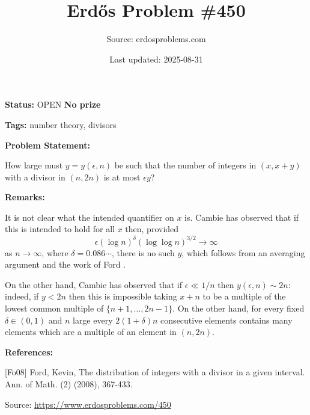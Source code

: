 \documentclass{article}
\title{Erd\H{o}s Problem \#450}
\date{Last updated: 2025-08-31}
\author{Source: erdosproblems.com}
\begin{document}
\maketitle

\noindent\textbf{Status:} OPEN \quad \textbf{No prize}

\noindent\textbf{Tags:} number theory, divisors

\medskip
\noindent\textbf{Problem Statement:}

How large must $y=y(\epsilon,n)$ be such that the number of integers in $(x,x+y)$ with a divisor in $(n,2n)$ is at most $\epsilon y$?

\bigskip
\noindent\textbf{Remarks:}

It is not clear what the intended quantifier on $x$ is. Cambie has observed that if this is intended to hold for all $x$ then, provided\[\epsilon(\log n)^\delta (\log\log n)^{3/2}\to \infty\]as $n\to \infty$, where $\delta=0.086\cdots$, there is no such $y$, which follows from an averaging argument and the work of Ford \cite{Fo08}. 

On the other hand, Cambie has observed that if $\epsilon\ll 1/n$ then $y(\epsilon,n)\sim 2n$: indeed, if $y<2n$ then this is impossible taking $x+n$ to be a multiple of the lowest common multiple of $\{n+1,\ldots,2n-1\}$. On the other hand, for every fixed $\delta\in (0,1)$ and $n$ large every $2(1+\delta)n$ consecutive elements contains many elements which are a multiple of an element in $(n,2n)$.

\bigskip
\noindent\textbf{References:}

[Fo08] Ford, Kevin, The distribution of integers with a divisor in a given
interval. Ann. of Math. (2) (2008), 367-433.

\bigskip
\noindent\small{Source: \url{https://www.erdosproblems.com/450}}
\end{document}
